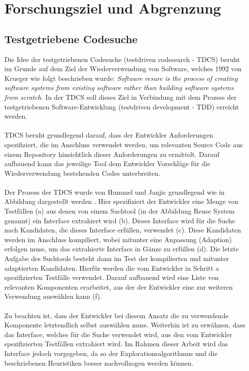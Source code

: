 \chapter{Forschungsziel und Abgrenzung}
\section{Testgetriebene Codesuche}
Die Idee der testgetriebenen Codesuche (testdriven codesearch - TDCS) beruht im Grunde auf dem Ziel der Wiederverwendung von Software, welches 1992 von Krueger wie folgt beschrieben wurde:
\emph{\glqq Software resure is the process of creating software systems from existing software rather than building software systems from scratch.\grqq{}} \cite{krueger} In der TDCS soll dieses Ziel in Verbindung mit dem Prozess der testgetriebenen Software-Entwicklung (testdriven development - TDD) erreicht werden. \cite{hummel08} 
\\\\
TDCS beruht grundlegend darauf, dass der Entwickler Anforderungen spezifiziert, die im Anschluss verwendet werden, um relevanten Source Code aus einem Repository hinsichtlich dieser Anforderungen zu ermittelt. Darauf aufbauend kann das jeweilige Tool dem Entwickler Vorschläge für die Wiederverwendung bestehenden Codes unterbreiten.
\\\\
Der Prozess der TDCS wurde von Hummel und Janjic grundlegend wie in Abbildung  dargestellt werden \cite{Hummel2013}.
\noindent
Hier spezifiziert der Entwickler eine Menge von Testfällen (a) aus denen von einem Suchtool (in der Abbildung \glqq Reuse System\grqq{} genannt) ein Interface extrahiert wird (b). Dieses Interface wird für die Suche nach Kandidaten, die dieses Interface erfüllen, verwendet (c). Diese Kandidaten werden im Anschluss kompiliert, wobei mitunter eine Anpassung (Adaption) erfolgen muss, um das extrahierte Interface in Gänze zu erfüllen (d). Die letzte Aufgabe des Suchtools besteht dann im Test der kompilierten und mitunter adaptierten Kandidaten. Hierfür werden die vom Entwickler in Schritt a spezifizierten Testfälle verwendet. Darauf aufbauend wird eine Liste von relevanten Komponenten erarbeitet, aus der der Entwickler eine zur weiteren Verwendung auswählen kann (f).
\\\\
Zu beachten ist, dass der Entwickler bei diesem Ansatz die zu verwendende Komponente letztendlich selbst auswählen muss. Weiterhin ist zu erwähnen, dass das Interface, welches für die Suche verwendet wird, aus den vom Entwickler spezifizierten Testfällen extrahiert wird. Im Rahmen dieser Arbeit wird das Interface jedoch vorgegeben, da so der Explorationsalgorithmus und die beschriebenen Heuristiken besser nachvollzogen werden können.
